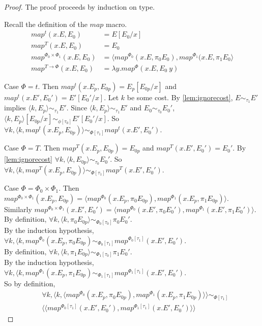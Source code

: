 %
\begin{proof}
  The proof proceeds by induction on type.

  Recall the definition of the $map$ macro.
  \begin{align*}
    map^t(x.E, E_0) &= E[E_0/x]                                                                                       \\
    map^T(x.E, E_0) &= E_0                                                                                            \\ 
    map^{\Phi_0 \times \Phi_1}(x.E, E_0) &= \langle map^{\Phi_0}(x.E, \pi_0 E_0), map^{\Phi_1}(x.E, \pi_1 E_0 \rangle \\
    map^{T \to \Phi}(x.E, E_0) &= \lambda y.map^\Phi(x.E, E_0\ y)
  \end{align*}

  Case $\Phi = t$.
  Then $map^t(x.E_p, E_{0p}) = E_p[E_{0p}/x]$ and $map^t(x.E', E_0') = E'[E_0'/x]$.
  Let $k$ be some cost.
  By \ref{lem:ignorecost}, $E \sim_{\tau_1} E'$ implies $\langle k, E_p \rangle \sim_{\tau_1} E'$.
  Since $\langle k, E_p \rangle \sim_{\tau_1} E'$ and $E_0 \sim_{\tau_0} E_0'$, $\langle k, E_p \rangle [E_{0p}/x] \sim_{\phi[\tau_0]} E'[E_0'/x]$.
  So $\forall k, \langle k, map^t(x.E_p, E_{0p}) \rangle \sim_{\Phi[\tau_1]} map^t(x.E', E_0')$.

  Case $\Phi = T$.
  Then $map^T(x.E_p, E_{0p}) = E_{0p}$ and $map^T(x.E', E_0') = E_0'$.
  By \ref{lem:ignorecost} $\forall k, \langle k, E_{0p} \rangle \sim_{\tau_0} E_0'$.
  So $\forall k, \langle k, map^T(x.E_p, E_{0p}) \rangle \sim_{\Phi[\tau_1]} map^T(x.E', E_0')$.

  Case $\Phi = \Phi_0 \times \Phi_1$.
  Then \\
  $map^{\Phi_0 \times \Phi_1}(x. E_p, E_{0p}) = \langle map^{\Phi_0}(x. E_p, \pi_0 E_{0p}), map^{\Phi_1}(x. E_p, \pi_1 E_{0p}) \rangle$.\\
  Similarly $map^{\Phi_0 \times \Phi_1}(x. E', E_0') = \langle map^{\Phi_0}(x. E', \pi_0 E_0'), map^{\Phi_1}(x. E', \pi_1 E_0') \rangle$.\\
  By definition, $\forall k, \langle k, \pi_0 E_{0p} \rangle \sim_{\Phi_0[\tau_0]} \pi_0 E_0'$.\\
  By the induction hypothesis, $\forall k, \langle k, map^{\Phi_0}(x. E_p, \pi_0 E_{0p}) \sim_{\Phi_0[\tau_1]} map^{\Phi_0[\tau_1]}(x. E', E_0')$.\\
  By definition, $\forall k, \langle k, \pi_1 E_{0p} \rangle \sim_{\Phi_1[\tau_0]} \pi_1 E_0'$.\\
  By the induction hypothesis, $\forall k, \langle k, map^{\Phi_1}(x. E_p, \pi_1 E_{0p}) \sim_{\Phi_1[\tau_1]} map^{\Phi_1[\tau_1]}(x. E', E_0')$.\\
  So by definition,
  \begin{align*}
    &\forall k, \langle k, \langle map^{\Phi_0}(x. E_p, \pi_0 E_{0p}), map^{\Phi_1}(x. E_p, \pi_1 E_{0p}) \rangle \rangle \sim_{\Phi[\tau_1]}  \\
    &\langle \langle map^{\Phi_0[\tau_1]}(x. E', E_0'), map^{\Phi_1[\tau_1]}(x. E', E_0') \rangle \rangle
  \end{align*}


\end{proof}
